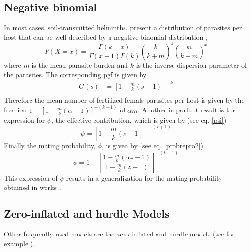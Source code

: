 \documentclass[bimj,fleqn]{w-art}
\theoremstyle{plain}
\theoremstyle{definition}
\begin{document}
\subsection{Negative binomial}
In most cases, soil-transmitted helminths, present a distribution of parasites per host that can be well described by a negative binomial distribution \cite{bundy1987epidemiology,hoagland1978necator,seo1979frequency},
\begin{equation}
P(X=x)=\frac{\Gamma(k+x)}{\Gamma(x+1)\Gamma(k)}\left( \frac{k}{k+m}\right) ^k \left( \frac{m}{k+m}\right) ^x
\end{equation}
where $m$ is the mean parasite burden and $k$ is the inverse dispersion parameter of the parasites. The corresponding pgf is given by
\begin{equation}
\begin{split}
G(s)&=\left[ 1-\frac{m}{k}(s-1)\right] ^{-k}\\
\end{split}
\end{equation}
Therefore the mean number of fertilized female parasites per host is given by the fraction
$ 1-\left[ 1-\frac{m}{k}(\alpha-1)\right] ^{-(k+1)} $  of $\alpha m$. 
Another important result is the expression for $\psi$, the effective contribution, which is given by (see eq. \eqref{psi})
\begin{equation}\label{phibn}
\psi=	 \left[ 1-\frac{m}{k}(z-1)\right] ^{-(k+1)} 
\end{equation}     
Finally the mating probability, $\phi$, is given by (see eq. \eqref{probrepro2})
\begin{equation} 
\phi=
1-\left[ \frac{ 1-\frac{m}{k}(\alpha z-1)}{1-\frac{m}{k}(z-1) }\right]  ^{-(k+1)} 
\end{equation}
This expression of $\phi$ results in a generalization for the mating probability obtained in works  \cite{anderson1992infectious,may1993biased,may1977togetherness}.
\subsection{Zero-inflated and hurdle Models}
Other frequently used models  are the zero-inflated and hurdle models (see for example  \cite{abdybekova2012frequency,crofton1971quantitative,denwood2008distribution,ziadinov2010frequency}).
\end{document}
